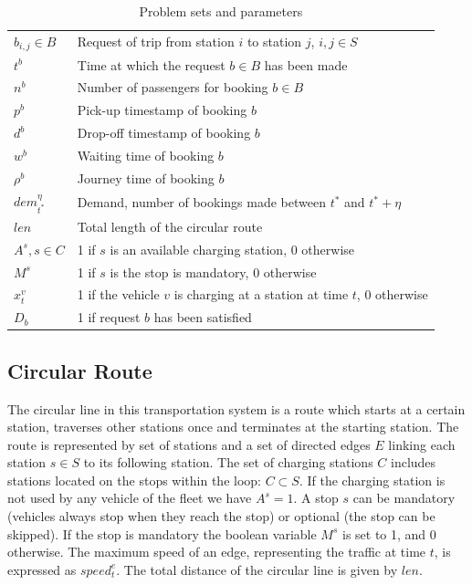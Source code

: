 \documentclass[12pt,a4paper]{article}
\begin{document}
\begin{table}
{\begin{tabular}{| l | l |}
  $b_{i,j} \in B$ & Request of trip from station $i$ to station $j$, $i,j \in S$ \\
  $t^{b}$ & Time at which the request $b \in B$ has been made \\
  $n^{b}$ & Number of passengers for booking $b \in B$ \\
  $p^{b}$ & Pick-up timestamp of booking $b$ \\
  $d^{b}$ & Drop-off timestamp of booking $b$ \\
  $w^{b}$ & Waiting time of booking $b$ \\
  $\rho^{b}$ & Journey time of booking $b$ \\
  $dem_{t^{*}}^{\eta}$ & Demand, number of bookings made between $t^{*}$ and $t^{*} + \eta$\\
  $len$ & Total length of the circular route \\

  $A^{s}, s \in C$ & 1 if $s$ is an available charging station, 0 otherwise \\
  $M^{s}$ & 1 if $s$ is the stop is mandatory, 0 otherwise \\
  $x^{v}_{t}$ & 1 if the vehicle $v$ is charging at a station at time $t$, 0 otherwise \\
  $D_{b}$ & 1 if request $b$ has been satisfied \\
  \hline  
\end{tabular}
}
\caption{Problem sets and parameters}
\label{table:parameters}
\end{table}
\subsection{Circular Route}
The circular line in this transportation system is a route which starts at a certain station, traverses other stations once and terminates at the starting station. The route is represented by set of stations  and a set of directed edges $E$ linking each station $s \in S$ to its following station. The set of charging stations $C$ includes stations located on the stops within the loop: $C \subset S$. If the charging station is not used by any vehicle of the fleet we have $A^{s} = 1$. A stop $s$ can be mandatory (vehicles always stop when they reach the stop) or optional (the stop can be skipped). If the stop is mandatory the boolean variable $M^{s}$ is set to 1, and 0 otherwise. The maximum speed of an edge, representing the traffic at time $t$, is expressed as $speed^{e}_{t}$. The total distance of the circular line is given by $len$.
\end{document}
